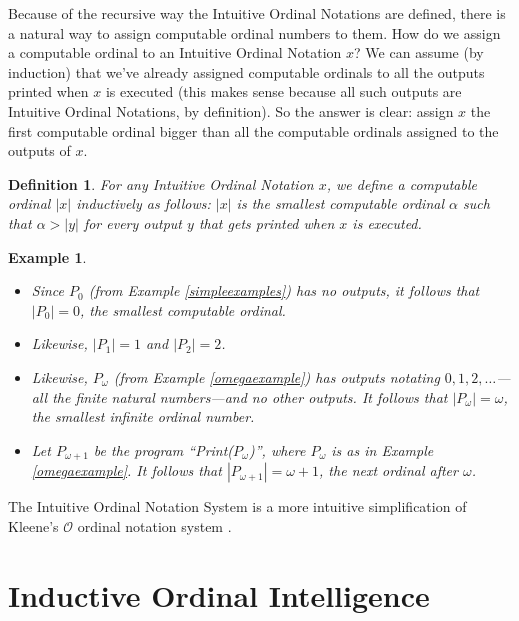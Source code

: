 \documentclass[runningheads]{llncs}
\newtheorem{myexample}[mytheorem]{Example}
\newtheorem{mydefinition}[mytheorem]{Definition}
\begin{document}
Because of the recursive way the Intuitive Ordinal Notations are defined, there is a
natural way to assign computable ordinal numbers to them.
How do we assign a computable ordinal to an Intuitive Ordinal Notation $x$?
We can assume (by induction) that we've
already assigned computable ordinals to all the outputs printed when $x$
is executed (this makes sense because all such outputs are Intuitive Ordinal Notations,
by definition). So the answer is clear: assign $x$ the first computable ordinal bigger
than all the computable ordinals assigned to the outputs of $x$.

\begin{mydefinition}
    For any Intuitive Ordinal Notation $x$, we define a computable ordinal $|x|$
    inductively as follows: $|x|$ is the smallest computable ordinal $\alpha$
    such that $\alpha>|y|$ for every output $y$ that gets printed when $x$ is
    executed.
\end{mydefinition}

\begin{myexample}
    \begin{itemize}
        \item
        Since $P_0$ (from Example \ref{simpleexamples}) has no outputs,
        it follows that $|P_0|=0$, the smallest computable ordinal.
        \item
        Likewise, $|P_1|=1$ and $|P_2|=2$.
        \item
        Likewise, $P_\omega$ (from Example \ref{omegaexample}) has outputs
        notating $0, 1, 2, \ldots$---all the finite natural numbers---and no
        other outputs. It follows that $|P_\omega|=\omega$, the smallest
        infinite ordinal number.
        \item
        Let $P_{\omega+1}$ be the program ``Print($P_\omega$)'',
        where $P_\omega$ is as in Example \ref{omegaexample}.
        It follows that $|P_{\omega+1}|=\omega+1$, the next ordinal after
        $\omega$.
    \end{itemize}
\end{myexample}

The Intuitive Ordinal Notation System is a more intuitive simplification of
Kleene's $\mathcal O$ ordinal notation system \cite{kleene1938notation}.

\section{Inductive Ordinal Intelligence}
\label{informalargumentsection}
\end{document}
